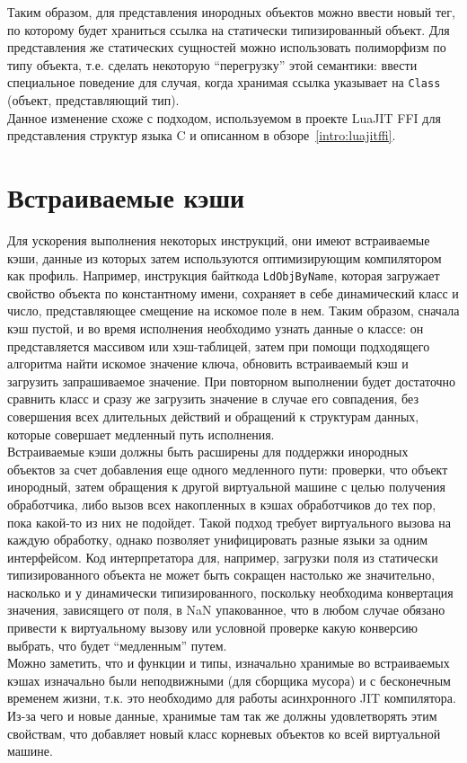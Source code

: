 \documentclass[times,specification,annotation]{itmo-student-thesis}
\begin{document}
Таким образом, для представления инородных объектов можно ввести новый тег, по которому будет храниться ссылка на статически типизированный объект. Для представления же статических сущностей можно использовать полиморфизм по типу объекта, т.е. сделать некоторую ``перегрузку'' этой семантики: ввести специальное поведение для случая, когда хранимая ссылка указывает на \texttt{Class} (объект, представляющий тип).\\
Данное изменение схоже с подходом, используемом в проекте LuaJIT FFI для представления структур языка C и описанном в обзоре~\ref{intro:luajitffi}.

\section{Встраиваемые кэши}
Для ускорения выполнения некоторых инструкций, они имеют встраиваемые кэши, данные из которых затем используются оптимизирующим компилятором как профиль. Например, инструкция байткода \texttt{LdObjByName}, которая загружает свойство объекта по константному имени, сохраняет в себе динамический класс и число, представляющее смещение на искомое поле в нем. Таким образом, сначала кэш пустой, и во время исполнения необходимо узнать данные о классе: он представляется массивом или хэш-таблицей, затем при помощи подходящего алгоритма найти искомое значение ключа, обновить встраиваемый кэш и загрузить запрашиваемое значение. При повторном выполнении будет достаточно сравнить класс и сразу же загрузить значение в случае его совпадения, без совершения всех длительных действий и обращений к структурам данных, которые совершает медленный путь исполнения.\\
Встраиваемые кэши должны быть расширены для поддержки инородных объектов за счет добавления еще одного медленного пути: проверки, что объект инородный, затем обращения к другой виртуальной машине с целью получения обработчика, либо вызов всех накопленных в кэшах обработчиков до тех пор, пока какой-то из них не подойдет. Такой подход требует виртуального вызова на каждую обработку, однако позволяет унифицировать разные языки за одним интерфейсом. Код интерпретатора для, например, загрузки поля из статически типизированного объекта не может быть сокращен настолько же значительно, насколько и у динамически типизированного, поскольку необходима конвертация значения, зависящего от поля, в NaN упакованное, что в любом случае обязано привести к виртуальному вызову или условной проверке какую конверсию выбрать, что будет ``медленным'' путем.\\
Можно заметить, что и функции и типы, изначально хранимые во встраиваемых кэшах изначально были неподвижными (для сборщика мусора) и с бесконечным временем жизни, т.к. это необходимо для работы асинхронного JIT компилятора. Из-за чего и новые данные, хранимые там так же должны удовлетворять этим свойствам, что добавляет новый класс корневых объектов ко всей виртуальной машине.
\end{document}
